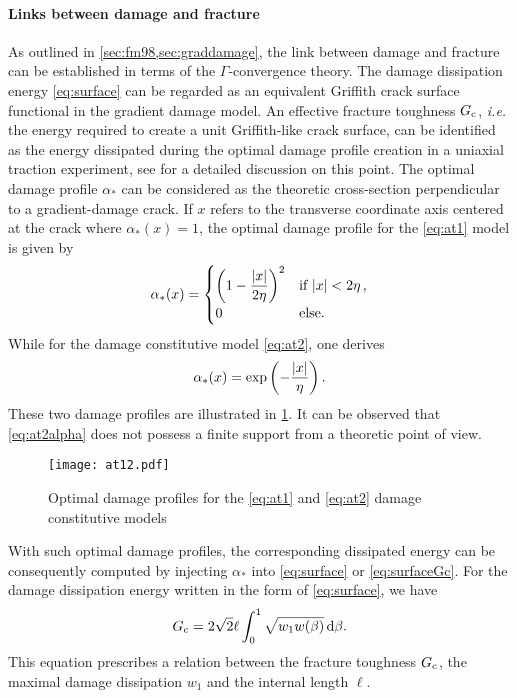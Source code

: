 \paragraph{Links between damage and fracture} As outlined in \cref{sec:fm98,sec:graddamage}, the link between damage and fracture can be established in terms of the $\Gamma$-convergence theory. The damage dissipation energy \eqref{eq:surface} can be regarded as an equivalent Griffith crack surface functional in the gradient damage model. An effective fracture toughness $G_\mathrm{c}$, \emph{i.e.} the energy required to create a unit Griffith-like crack surface, can be identified as the energy dissipated during the optimal damage profile creation in a uniaxial traction experiment, see \cite{PhamAmorMarigoMaurini:2011} for a detailed discussion on this point. The optimal damage profile $\alpha_*$ can be considered as the theoretic cross-section perpendicular to a gradient-damage crack. If $x$ refers to the transverse coordinate axis centered at the crack where $\alpha_*(x)=1$, the optimal damage profile for the \eqref{eq:at1} model is given by
\begin{equation} \label{eq:at1alpha}
\alpha_*(x)=\begin{cases}
\left(1-\dfrac{\left\lvert{x}\right\rvert}{2\eta}\right)^2 & \text{if $\left\lvert{x}\right\rvert<2\eta$\,,} \\
0 & \text{else}.
\end{cases}
\end{equation}
While for the damage constitutive model \eqref{eq:at2}, one derives
\begin{equation} \label{eq:at2alpha}
\alpha_*(x)=\exp\left(-\frac{\left\lvert{x}\right\rvert}{\eta}\right).
\end{equation}
These two damage profiles are illustrated in \cref{fig:at12}. It can be observed that \eqref{eq:at2alpha} does not possess a finite support from a theoretic point of view.
\begin{figure}[htbp]
\centering
\texttt{[image: at12.pdf]}
\caption{Optimal damage profiles for the \eqref{eq:at1} and \eqref{eq:at2} damage constitutive models} \label{fig:at12}
\end{figure}
With such optimal damage profiles, the corresponding dissipated energy can be consequently computed by injecting $\alpha_*$ into \eqref{eq:surface} or \eqref{eq:surfaceGc}. For the damage dissipation energy written in the form of \eqref{eq:surface}, we have
\begin{equation} \label{eq:gcingd}
G_\mathrm{c}=2\sqrt{2}\ell\int_0^1\sqrt{w_1w(\beta)}\,\mathrm{d}\beta.
\end{equation}
This equation prescribes a relation between the fracture toughness $G_\mathrm{c}$, the maximal damage dissipation $w_1$ and the internal length $\ell$.

